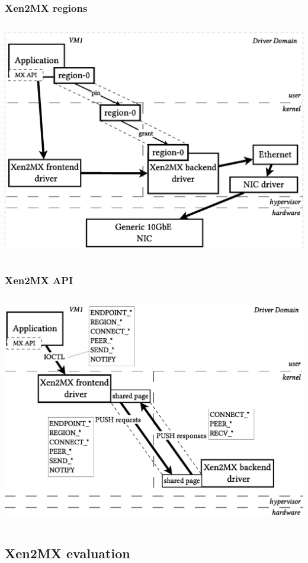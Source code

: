 \documentclass[red,slidestop,notes,compress,mathserif]{beamer}
\begin{document}
\begin{frame}
\frametitle{Xen2MX regions}
\begin{columns}
\includegraphics[width=\textwidth]{figs/bare/xen2mx_regions.eps}
\end{columns}
\end{frame}

\begin{frame}
\frametitle{Xen2MX API}
\begin{columns}
\includegraphics[width=\textwidth]{figs/bare/xen2mx_messages.eps}
\end{columns}
\end{frame}

\subsection{Xen2MX evaluation}
\end{document}
